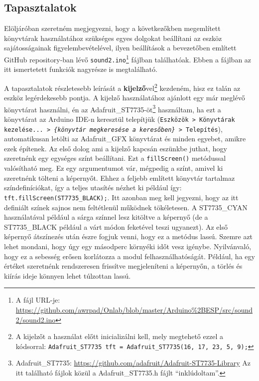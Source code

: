 \documentclass[12pt,a4paper]{article}
\begin{document}
    \subsection{Tapasztalatok}
      Elöljáróban szeretném megjegyezni, hogy a következőkben megemlített könyvtárak használatához szükséges egyes dolgokat beállítani az eszköz sajátosságainak figyelembevételével, ilyen beállítások a bevezetőben említett GitHub repository-ban lévő \texttt{sound2.ino}\footnote{A fájl URL-je: \url{https://github.com/awrpad/Onlab/blob/master/Arduino\%2BESP/src/sound2/sound2.ino}} fájlban találhatóak. Ebben a fájlban az itt ismertetett funkciók nagyrésze is megtalálható.

      A tapasztalatok részletesebb leírását a \textbf{kijelző}vel\footnote{A kijelzőt a használat előtt inicializálni kell, mely megtehető ezzel a kódsorral: \texttt{Adafruit\_ST7735 tft = Adafruit\_ST7735(16, 17, 23, 5, 9);}} kezdeném, hisz ez talán az eszköz legérdekesebb pontja.
      A kijelző használatához ajánlott egy már meglévő könyvtárat használni, én az Adafruit\_ST7735-öt\footnote{Adafruit\_ST7735: \url{https://github.com/adafruit/Adafruit-ST7735-Library} Az itt található fájlok közül a Adafruit\_ST7735.h fájlt ``inklúdoltam''.} használtam, ha ezt a könyvtárat az Arduino IDE-n keresztül telepítjük (\texttt{Eszközök > Könyvtárak kezelése... > \textit{\{könyvtár megkeresése a keresőben\}} > Telepítés}), automatikusan letölti az Adafruit\_GFX könyvtárat és minden egyebet, amikre ezek építenek.
      Az első dolog ami a kijelző kapcsán eszünkbe juthat, hogy szeretnénk egy egységes színt beállítani. Ezt a \texttt{fillScreen()} metódussal valósítható meg. Ez egy argumentumot vár, mégpedig a színt, amivel ki szeretnénk tölteni a képernyőt. Ehhez a feljebb említett könyvtár tartalmaz színdefiníciókat, így a teljes utasítés nézhet ki például így: \texttt{tft.fillScreen(ST7735\_BLACK);}. Itt azonban meg kell jegyezni, hogy az itt definiált színek sajnos nem feltétlenül működnek tökéletesen. A ST7735\_CYAN használatával például a sárga színnel lesz kitöltve a képernyő (de a ST7735\_BLACK például a várt módon feketével teszi ugyanezt).
      Az első képernyő átszínezés után észre fogjuk venni, hogy ez a metódus lassú. Szemre azt lehet mondani, hogy úgy egy másodperc környéki időt vesz igénybe. Nyilvánvaló, hogy ez a sebesség erősen korlátozza a modul felhasználhatóságát. Például, ha egy értéket szeretnénk rendszeresen frissítve megjeleníteni a képernyőn, a törlés és kiírás ideje könnyen lehet túlzottan lassú.
\end{document}
